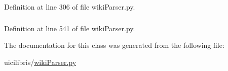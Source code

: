 \-Definition at line 306 of file wiki\-Parser.\-py.

\hypertarget{classuicilibris_1_1wikiParser_1_1wikiParser_ab56a382d82bac5dcf1ccefbd25084447}{
\subsubsection[{url\-Lines}]{}}\label{classuicilibris_1_1wikiParser_1_1wikiParser_ab56a382d82bac5dcf1ccefbd25084447}


\-Definition at line 541 of file wiki\-Parser.\-py.



\-The documentation for this class was generated from the following file\-:\begin{DoxyCompactItemize}
\item 
uicilibris/\hyperlink{wikiParser_8py}{wiki\-Parser.\-py}\end{DoxyCompactItemize}
